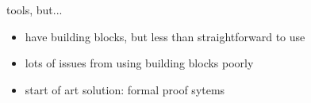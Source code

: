 \begin{frame}{tools, but...}
    \begin{itemize}
    \item have building blocks, but less than straightforward to use
    \vspace{.5cm}
    \item lots of issues from using building blocks poorly
    \item start of art solution: formal proof sytems
    \end{itemize}
\end{frame}
